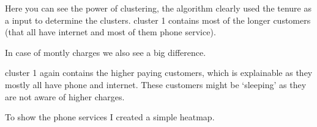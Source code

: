 \documentclass[letterpaper,10pt,english]{jupyterBook}
\begin{document}
\noindent{}

\sphinxAtStartPar
Here you can see the power of clustering, the algorithm clearly used the tenure as a input to determine the clusters. cluster 1 contains most of the longer customers (that all have internet and most of them phone service).

\sphinxAtStartPar
In case of montly charges we also see a big difference.

\begin{sphinxVerbatim}[commandchars=\\\{\}]
\PYG{p}{[}\PYG{p}{]}  
\PYG{p}{[}\PYG{p}{]}  
\end{sphinxVerbatim}

\noindent{}

\sphinxAtStartPar
cluster 1 again contains the higher paying customers, which is explainable as they mostly all have phone and internet. These customers might be ‘sleeping’ as they are not aware of higher charges.

\sphinxAtStartPar
To show the phone services I created a simple heatmap.

\begin{sphinxVerbatim}[commandchars=\\\{\}]
   
\end{sphinxVerbatim}
\end{document}
